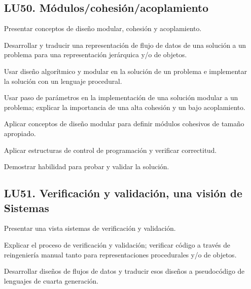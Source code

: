 \subsection{LU50. Módulos/cohesión/acoplamiento}\label{sec:LU50}
\begin{LearningUnit}
\begin{LUGoal}
\item Presentar conceptos de diseño modular, cohesión y acoplamiento.
\end{LUGoal}

\begin{LUObjective}
\item Desarrollar y traducir una representación de flujo de datos de una solución a un problema para una representación jerárquica y/o de objetos.
\item Usar diseño algorítmico y modular en la solución de un problema e implementar la solución con un lenguaje procedural.
\item Usar paso de parámetros en la implementación de una solución modular a un problema; explicar la importancia de una alta cohesión y un bajo acoplamiento.
\item Aplicar conceptos de diseño modular para definir módulos cohesivos de tamaño apropiado.
\item Aplicar estructuras de control de programación y verificar correctitud.
\item Demostrar habilidad para probar y validar la solución.
\end{LUObjective}
\end{LearningUnit}

\subsection{LU51. Verificación y validación, una visión de Sistemas}\label{sec:LU51}
\begin{LearningUnit}
\begin{LUGoal}
\item Presentar una vista sistemas de verificación y validación.
\end{LUGoal}

\begin{LUObjective}
\item Explicar el proceso de verificación y validación; verificar código a través de reingeniería manual tanto para representaciones procedurales y/o de objetos.
\item Desarrollar diseños de flujos de datos y traducir esos diseños a pseudocódigo de lenguajes de cuarta generación.
\end{LUObjective}
\end{LearningUnit}

